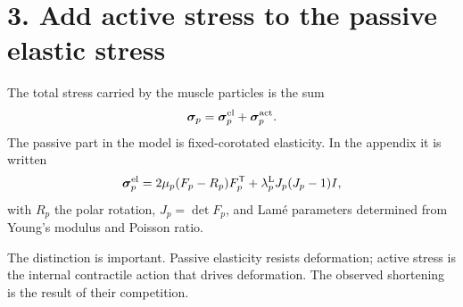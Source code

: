 \documentclass[11pt]{article}
\newcommand{\sig}{\boldsymbol{\sigma}}
\begin{document}
\section*{3. Add active stress to the passive elastic stress}
The total stress carried by the muscle particles is the sum
\begin{equation}
\sig_p=\sig^{\rm el}_p+\sig^{\rm act}_p.
\label{eq:auto10}
\end{equation}
The passive part in the model is fixed-corotated elasticity. In the appendix it is written
\begin{equation}
\sig^{\rm el}_p
=
2\mu_p(F_p-R_p)F_p^{\mathsf T}
+
\lambda_p^{\rm L}J_p(J_p-1)I,
\label{eq:elastic}
\end{equation}
with $R_p$ the polar rotation, $J_p=\det F_p$, and Lam\'e parameters determined from Young's modulus and Poisson ratio.

The distinction is important. Passive elasticity resists deformation; active stress is the internal contractile action that drives deformation. The observed shortening is the result of their competition.
\end{document}
